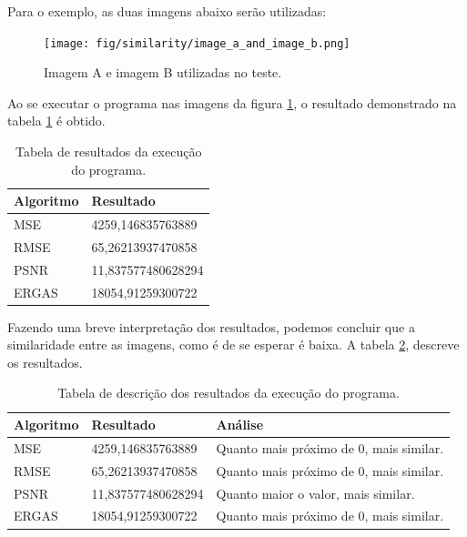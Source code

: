 Para o exemplo, as duas imagens abaixo serão utilizadas:

\begin{figure}[H]
    \centering
    \caption{Imagem A e imagem B utilizadas no teste.}
    \texttt{[image: fig/similarity/image\_a\_and\_image\_b.png]}
    \label{fig:fig32}
\end{figure}

Ao se executar o programa nas imagens da figura \ref{fig:fig32}, o resultado demonstrado na tabela \ref{tab:image_similarity_test} é obtido.

\begin{table}[H]
    \centering
    \caption{Tabela de resultados da execução do programa.}
    \begin{tabular}{|l|l|} \hline
        \textbf{Algoritmo} & \textbf{Resultado}      \\ \hline
        MSE                & 4259,146835763889       \\ \hline
        RMSE               & 65,26213937470858       \\ \hline
        PSNR               & 11,837577480628294      \\ \hline
        ERGAS              & 18054,91259300722       \\ \hline
    \end{tabular}
    \vspace{0.3cm}
    \label{tab:image_similarity_test}
\end{table}

Fazendo uma breve interpretação dos resultados, podemos concluir que a similaridade entre as imagens, como é de se esperar é baixa. A tabela \ref{tab:image_similarity_test_results_analysis}, descreve os resultados.

\begin{table}[H]
    \centering
    \caption{Tabela de descrição dos resultados da execução do programa.}
    \begin{tabular}{|l|l|l|} \hline
        \textbf{Algoritmo} & \textbf{Resultado} & \textbf{Análise}                        \\ \hline
        MSE                & 4259,146835763889  & Quanto mais próximo de 0, mais similar. \\ \hline
        RMSE               & 65,26213937470858  & Quanto mais próximo de 0, mais similar. \\ \hline
        PSNR               & 11,837577480628294 & Quanto maior o valor, mais similar.     \\ \hline
        ERGAS              & 18054,91259300722  & Quanto mais próximo de 0, mais similar. \\ \hline
    \end{tabular}
    \vspace{0.3cm}
    \label{tab:image_similarity_test_results_analysis}
\end{table}

